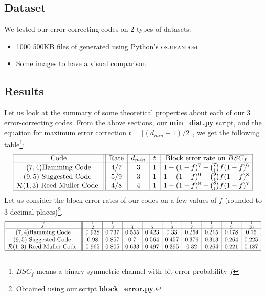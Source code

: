 \documentclass[12pt, a4paper]{article}
\begin{document}
\subsection{Dataset}
We tested our error-correcting codes on 2 types of datasets:
\begin{itemize}
\item 1000 500KB files of generated using Python's \textsc{os.urandom}
\item Some images to have a visual comparison
\end{itemize}

\subsection{Results}
Let us look at the summary of some theoretical properties about each of our 3 error-correcting codes. From the above sections, our \textbf{min\_dist.py} script, and the equation for maximum error correction $t = \lfloor (d_{min}-1)/2 \rfloor$, we get the following table\footnote{$BSC_f$ means a binary symmetric channel with bit error probability $f$}:
$$
\begin{array}{|c||c|c|c|c|}
\hline
\text{Code} & \text{Rate} & d_{min} & t & \text{Block error rate on } BSC_f\\
\hline
(7,4) \text{Hamming Code} & 4/7 & 3 & 1 & 1 - (1-f)^7 - \binom{7}{1}f(1-f)^6\\
(9,5) \text{ Suggested Code } & 5/9 & 3 & 1 & 1 - (1-f)^9 - \binom{9}{1}f(1-f)^8\\
\mathcal{R}(1,3) \text{ Reed-Muller Code } & 4/8 & 4 & 1 & 1 - (1-f)^8 - \binom{8}{1}f(1-f)^7\\
\hline
\end{array}
$$
Let us consider the block error rates of our codes on a few values of $f$ (rounded to 3 decimal places)\footnote{Obtained using our script \textbf{block\_error.py}.}.
$$
\begin{array}{|c||c|c|c|c|c|c|c|c|c|}
\hline
f & \frac{1}{2} & \frac{1}{3} & \frac{1}{4} & \frac{1}{5} & \frac{1}{6} & \frac{1}{7} & \frac{1}{8} & \frac{1}{9} & \frac{1}{10}\\
\hline
(7,4) \text{Hamming Code} & 0.938 & 0.737 & 0.555 & 0.423 & 0.33 & 0.264 &  0.215 & 0.178 & 0.15\\
(9,5) \text{ Suggested Code } & 0.98 & 0.857 & 0.7 & 0.564 & 0.457 & 0.376 & 0.313 & 0.264 & 0.225\\
\mathcal{R}(1,3) \text{ Reed-Muller Code } &0.965 & 0.805 & 0.633 & 0.497 & 0.395 & 0.32 & 0.264 & 0.221 & 0.187\\
\hline
\end{array}
$$
\end{document}
